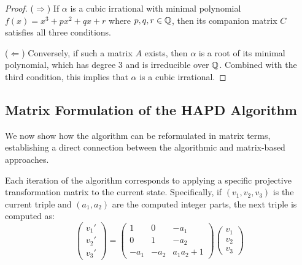 \begin{proof}
($\Rightarrow$) If $\alpha$ is a cubic irrational with minimal polynomial $f(x) = x^3 + px^2 + qx + r$ where $p, q, r \in \mathbb{Q}$, then its companion matrix $C$ satisfies all three conditions.

($\Leftarrow$) Conversely, if such a matrix $A$ exists, then $\alpha$ is a root of its minimal polynomial, which has degree 3 and is irreducible over $\mathbb{Q}$. Combined with the third condition, this implies that $\alpha$ is a cubic irrational.
\end{proof}

\subsection{Matrix Formulation of the HAPD Algorithm}

We now show how the \HAPD{} algorithm can be reformulated in matrix terms, establishing a direct connection between the algorithmic and matrix-based approaches.

\begin{proposition}\label{prop:matrix_hapd}
Each iteration of the \HAPD{} algorithm corresponds to applying a specific projective transformation matrix to the current state. Specifically, if $(v_1, v_2, v_3)$ is the current triple and $(a_1, a_2)$ are the computed integer parts, the next triple is computed as:
\begin{equation}
\begin{pmatrix} v_1' \\ v_2' \\ v_3' \end{pmatrix} = 
\begin{pmatrix} 
1 & 0 & -a_1 \\
0 & 1 & -a_2 \\
-a_1 & -a_2 & a_1a_2 + 1
\end{pmatrix}
\begin{pmatrix} v_1 \\ v_2 \\ v_3 \end{pmatrix}
\end{equation}
\end{proposition}

